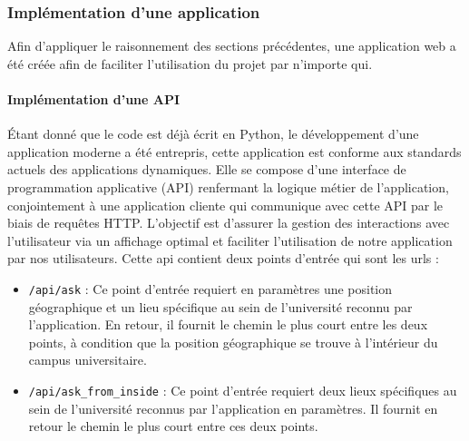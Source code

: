\documentclass[journal, a4paper]{IEEEtran}
\begin{document}
\subsubsection{Implémentation d'une application}
Afin d'appliquer le raisonnement des sections précédentes, une application web a été créée afin de faciliter l'utilisation du projet par n'importe qui.


\vspace{0.25cm}

\paragraph{Implémentation d'une API}
Étant donné que le code est déjà écrit en Python, le développement d'une application moderne a été entrepris, cette application est conforme aux standards actuels des applications dynamiques. Elle se compose d'une interface de programmation applicative (API) renfermant la logique métier de l'application, conjointement à une application cliente qui communique avec cette API par le biais de requêtes HTTP. L'objectif est d'assurer la gestion des interactions avec l'utilisateur via un affichage optimal et faciliter l'utilisation de notre application par nos utilisateurs. Cette api contient deux points d'entrée qui sont les urls : 
\begin{itemize}
\item \texttt{/api/ask} : Ce point d'entrée requiert en paramètres une position géographique et un lieu spécifique au sein de l'université reconnu par l'application. En retour, il fournit le chemin le plus court entre les deux points, à condition que la position géographique se trouve à l'intérieur du campus universitaire.
\item \texttt{/api/ask\_from\_inside} : Ce point d'entrée requiert deux lieux spécifiques au sein de l'université reconnus par l'application en paramètres. Il fournit en retour le chemin le plus court entre ces deux points.
\end{itemize}
\end{document}
